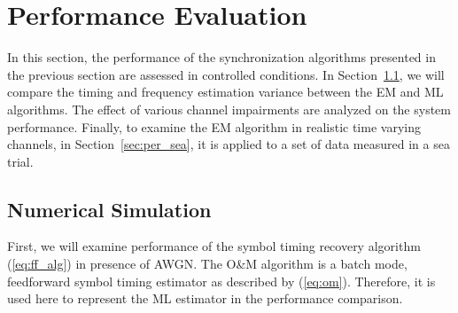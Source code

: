 \documentclass[journal,comsoc,onecolumn, 12pt,draftclsnofoot]{IEEEtran}
\begin{document}


\section{Performance Evaluation}
\label{sec:perfo}
In this section, the performance of the synchronization algorithms presented in the previous section are assessed in controlled conditions.
In Section~\ref{sec:per_sim}, we will compare the timing and frequency estimation variance between the EM and ML algorithms.
The effect of various channel impairments
are analyzed on the system performance.
Finally, to examine the EM algorithm in realistic time varying channels, in Section~\ref{sec:per_sea}, it is applied to a set of data measured in a sea trial.

\subsection{Numerical Simulation}
\label{sec:per_sim}
First, we will examine performance of the symbol timing recovery algorithm (\ref{eq:ff_alg}) in presence of AWGN.
The O\&M algorithm is a batch mode, feedforward symbol timing estimator as described by (\ref{eq:om}).
Therefore, it is used here to represent the ML estimator in the performance comparison.
\end{document}
